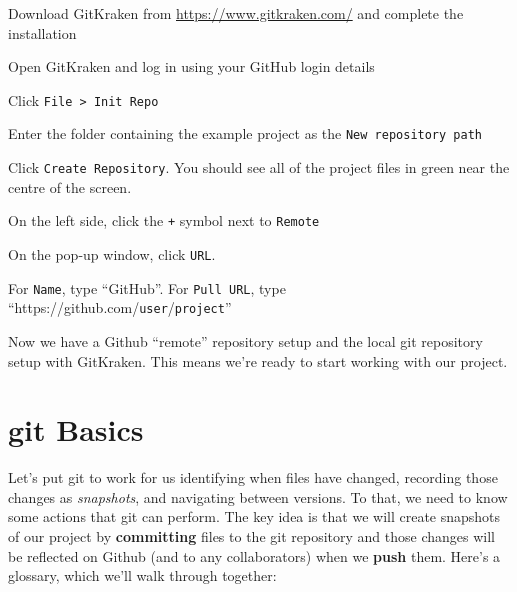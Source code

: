 \documentclass[12pt, a4paper]{article}
\begin{document}
\begin{enumerate*}
\item Download GitKraken from \url{https://www.gitkraken.com/} and complete the installation
\item Open GitKraken and log in using your GitHub login details
\item Click \texttt{File > Init Repo}
\item Enter the folder containing the example project as the \texttt{New repository path}
\item Click \texttt{Create Repository}. You should see all of the project files in green near the centre of the screen.
\item On the left side, click the \texttt{+} symbol next to \texttt{Remote}
\item On the pop-up window, click \texttt{URL}.
\item For \texttt{Name}, type ``GitHub''. For \texttt{Pull URL}, type ``https://github.com/\texttt{user}/\texttt{project}''
\end{enumerate*}

Now we have a Github ``remote'' repository setup and the local git repository setup with GitKraken. This means we're ready to start working with our project.

\clearpage

\section{git Basics}

Let's put git to work for us identifying when files have changed, recording those changes as \textit{snapshots}, and navigating between versions. To that, we need to know some actions that git can perform. The key idea is that we will create snapshots of our project by \textbf{committing} files to the git repository and those changes will be reflected on Github (and to any collaborators) when we \textbf{push} them. Here's a glossary, which we'll walk through together:
\end{document}
